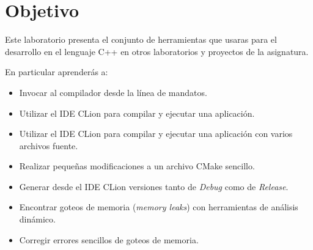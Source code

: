 \section{Objetivo}

Este laboratorio presenta el conjunto de herramientas que usaras para el desarrollo en el lenguaje C++
en otros laboratorios y proyectos de la asignatura.

En particular aprenderás a:


\begin{itemize}

  \item Invocar al compilador desde la línea de mandatos.
  \item Utilizar el IDE CLion para compilar y ejecutar una aplicación.
  \item Utilizar el IDE CLion para compilar y ejecutar una aplicación con varios archivos fuente.
  \item Realizar pequeñas modificaciones a un archivo CMake sencillo.
  \item Generar desde el IDE CLion versiones tanto de \emph{Debug} como de \emph{Release}.
  \item Encontrar goteos de memoria (\emph{memory leaks}) con herramientas de análisis dinámico.
  \item Corregir errores sencillos de goteos de memoria.

\end{itemize}
